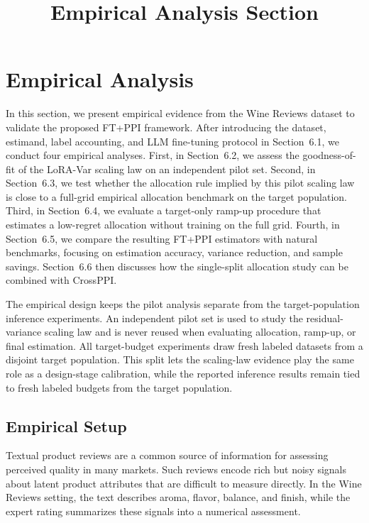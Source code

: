 \documentclass[11pt]{article}
\title{Empirical Analysis Section}
\author{}
\date{}
\begin{document}
\maketitle

\setcounter{section}{5}
\section{Empirical Analysis}

In this section, we present empirical evidence from the Wine Reviews dataset to validate the
proposed FT+PPI framework. After introducing the dataset, estimand, label accounting, and LLM
fine-tuning protocol in Section~6.1, we conduct four empirical analyses. First, in Section~6.2,
we assess the goodness-of-fit of the LoRA-Var scaling law on an independent pilot set. Second, in
Section~6.3, we test whether the allocation rule implied by this pilot scaling law is close to a
full-grid empirical allocation benchmark on the target population. Third, in Section~6.4, we
evaluate a target-only ramp-up procedure that estimates a low-regret allocation without training
on the full grid. Fourth, in Section~6.5, we compare the resulting FT+PPI estimators with
natural benchmarks, focusing on estimation accuracy, variance reduction, and sample savings.
Section~6.6 then discusses how the single-split allocation study can be combined with CrossPPI.

The empirical design keeps the pilot analysis separate from the target-population inference
experiments. An independent pilot set is used to study the residual-variance scaling law and is
never reused when evaluating allocation, ramp-up, or final estimation. All target-budget
experiments draw fresh labeled datasets from a disjoint target population. This split lets the
scaling-law evidence play the same role as a design-stage calibration, while the reported
inference results remain tied to fresh labeled budgets from the target population.

\subsection{Empirical Setup}
\label{subsec:empirical_setup}

Textual product reviews are a common source of information for assessing perceived quality in
many markets. Such reviews encode rich but noisy signals about latent product attributes that are
difficult to measure directly. In the Wine Reviews setting, the text describes aroma, flavor,
balance, and finish, while the expert rating summarizes these signals into a numerical assessment.
\end{document}
